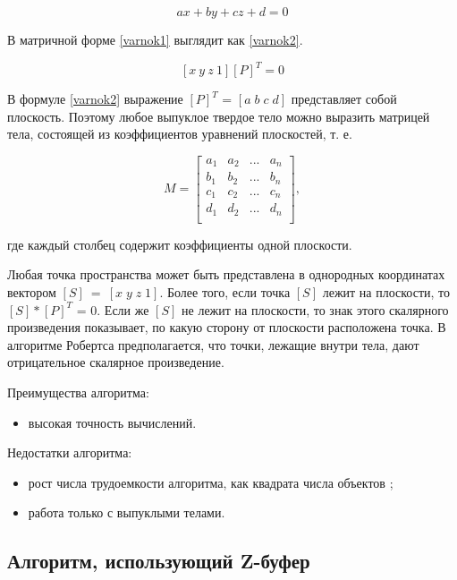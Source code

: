 \begin{equation}
	\label{varnok1}
	ax+by+cz+d = 0
\end{equation}

В матричной форме \ref{varnok1} выглядит как \ref{varnok2}.

\begin{equation}
	\label{varnok2}
	[x \: y \: z \: 1][P]^T = 0
\end{equation}

В формуле \ref{varnok2} выражение $[P]^T$ = $[a \; b \; c \; d]$ представляет собой плоскость. Поэтому любое выпуклое твердое тело можно выразить матрицей тела, состоящей из коэффициентов уравнений плоскостей, т. е.

\begin{equation}
	M = \begin{bmatrix}
		a_1 & a_2 & ... & a_n           \\[0.3em]
		b_1 & b_2 & ... & b_n           \\[0.3em]
		c_1 & c_2 & ... & c_n           \\[0.3em]
		d_1 & d_2 & ... & d_n           \\[0.3em]
	\end{bmatrix},
\end{equation}

где каждый столбец содержит коэффициенты одной плоскости.

Любая точка пространства может быть представлена в однородных координатах вектором $[S]~=~[x \; y \; z \; 1]$. Более того, если точка $[S]$ лежит на плоскости, то $[S]*[P]^T$ = 0. Если же $[S]$ не лежит на плоскости, то знак этого скалярного произведения показывает, по какую сторону от плоскости расположена точка. В алгоритме Робертса предполагается, что точки, лежащие внутри тела, дают отрицательное скалярное произведение. 

Преимущества алгоритма:
\begin{itemize}
	\item высокая точность вычислений.
\end{itemize}

Недостатки алгоритма:
\begin{itemize}
	\item рост числа трудоемкости алгоритма, как квадрата числа объектов \cite{demin};
	\item работа только с выпуклыми телами.
\end{itemize}

\subsection{Алгоритм, использующий Z-буфер}

